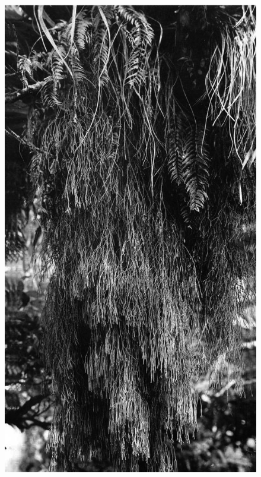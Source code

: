 \begin{figure}[!b]
	\begin{minipage}[t]{0.7\textwidth}
		\begin{minipage}[t]{(\textwidth-\fgap) * \real{0.564}}
			\centering
			\includegraphics[width=\textwidth]{graphics/figure42lycopodium.jpg}

\end{minipage}
\end{minipage}
\end{figure}
